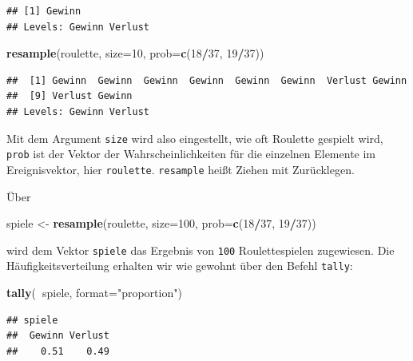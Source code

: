 \documentclass[12pt,ngerman,paper=a4,pagesize,DIV=13]{scrreprt}
\newenvironment{Shaded}{\begin{snugshade}}{\end{snugshade}}
\newcommand{\DataTypeTok}[1]{\textcolor[rgb]{0.13,0.29,0.53}{#1}}
\newcommand{\DecValTok}[1]{\textcolor[rgb]{0.00,0.00,0.81}{#1}}
\newcommand{\KeywordTok}[1]{\textcolor[rgb]{0.13,0.29,0.53}{\textbf{#1}}}
\newcommand{\NormalTok}[1]{#1}
\newcommand{\OperatorTok}[1]{\textcolor[rgb]{0.81,0.36,0.00}{\textbf{#1}}}
\newcommand{\StringTok}[1]{\textcolor[rgb]{0.31,0.60,0.02}{#1}}
\begin{document}
\begin{verbatim}
## [1] Gewinn
## Levels: Gewinn Verlust
\end{verbatim}

\begin{Shaded}
\begin{Highlighting}[]
\KeywordTok{resample}\NormalTok{(roulette, }\DataTypeTok{size=}\DecValTok{10}\NormalTok{, }\DataTypeTok{prob=}\KeywordTok{c}\NormalTok{(}\DecValTok{18}\OperatorTok{/}\DecValTok{37}\NormalTok{, }\DecValTok{19}\OperatorTok{/}\DecValTok{37}\NormalTok{))}
\end{Highlighting}
\end{Shaded}

\begin{verbatim}
##  [1] Gewinn  Gewinn  Gewinn  Gewinn  Gewinn  Gewinn  Verlust Gewinn 
##  [9] Verlust Gewinn 
## Levels: Gewinn Verlust
\end{verbatim}

Mit dem Argument \texttt{size} wird also eingestellt, wie oft Roulette
gespielt wird, \texttt{prob} ist der Vektor der Wahrscheinlichkeiten für
die einzelnen Elemente im Ereignisvektor, hier \texttt{roulette}.
\texttt{resample} heißt Ziehen mit Zurücklegen.

Über

\begin{Shaded}
\begin{Highlighting}[]
\NormalTok{spiele <-}\StringTok{ }\KeywordTok{resample}\NormalTok{(roulette, }\DataTypeTok{size=}\DecValTok{100}\NormalTok{, }\DataTypeTok{prob=}\KeywordTok{c}\NormalTok{(}\DecValTok{18}\OperatorTok{/}\DecValTok{37}\NormalTok{, }\DecValTok{19}\OperatorTok{/}\DecValTok{37}\NormalTok{))}
\end{Highlighting}
\end{Shaded}

wird dem Vektor \texttt{spiele} das Ergebnis von \texttt{100}
Roulettespielen zugewiesen. Die Häufigkeitsverteilung erhalten wir wie
gewohnt über den Befehl \texttt{tally}:

\begin{Shaded}
\begin{Highlighting}[]
\KeywordTok{tally}\NormalTok{(}\OperatorTok{~}\NormalTok{spiele, }\DataTypeTok{format=}\StringTok{"proportion"}\NormalTok{)}
\end{Highlighting}
\end{Shaded}

\begin{verbatim}
## spiele
##  Gewinn Verlust 
##    0.51    0.49
\end{verbatim}
\end{document}
